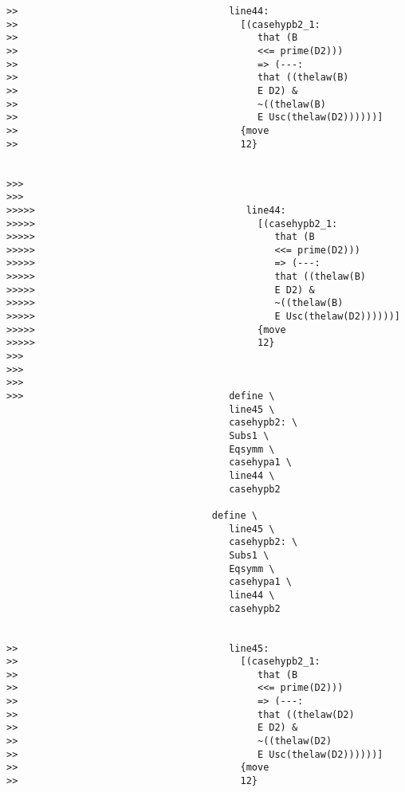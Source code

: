 \documentclass[12pt]{article}
\begin{document}
\begin{verbatim}
>>                                     line44:
>>                                       [(casehypb2_1:
>>                                          that (B
>>                                          <<= prime(D2)))
>>                                          => (---:
>>                                          that ((thelaw(B)
>>                                          E D2) &
>>                                          ~((thelaw(B)
>>                                          E Usc(thelaw(D2))))))]
>>                                       {move
>>                                       12}


>>>
>>>
>>>>>                                     line44:
>>>>>                                       [(casehypb2_1:
>>>>>                                          that (B
>>>>>                                          <<= prime(D2)))
>>>>>                                          => (---:
>>>>>                                          that ((thelaw(B)
>>>>>                                          E D2) &
>>>>>                                          ~((thelaw(B)
>>>>>                                          E Usc(thelaw(D2))))))]
>>>>>                                       {move
>>>>>                                       12}
>>>
>>>
>>>
>>>                                    define \
                                       line45 \
                                       casehypb2: \
                                       Subs1 \
                                       Eqsymm \
                                       casehypa1 \
                                       line44 \
                                       casehypb2

                                    define \
                                       line45 \
                                       casehypb2: \
                                       Subs1 \
                                       Eqsymm \
                                       casehypa1 \
                                       line44 \
                                       casehypb2


>>                                     line45:
>>                                       [(casehypb2_1:
>>                                          that (B
>>                                          <<= prime(D2)))
>>                                          => (---:
>>                                          that ((thelaw(D2)
>>                                          E D2) &
>>                                          ~((thelaw(D2)
>>                                          E Usc(thelaw(D2))))))]
>>                                       {move
>>                                       12}



\end{verbatim}
\end{document}
